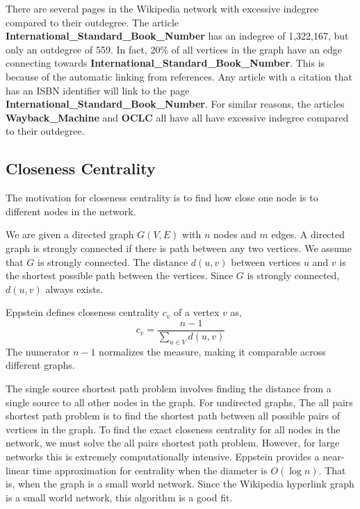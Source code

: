 \documentclass{article}
\begin{document}
There are several pages in the Wikipedia network with excessive indegree compared to their outdegree. 
The article \textbf{International\_Standard\_Book\_Number} has an indegree of 1,322,167, but only an outdegree of 559. In fact, 20\% of all vertices in the graph have an edge connecting towards \textbf{International\_Standard\_Book\_Number}.
This is because of the automatic linking from references.
Any article with a citation that has an ISBN identifier will link to the page \textbf{International\_Standard\_Book\_Number}.
For similar reasons, the articles \textbf{Wayback\_Machine} and \textbf{OCLC} all have all have excessive indegree compared to their outdegree.



\subsection{Closeness Centrality}


The motivation for closeness centrality is to find how close one node is to different nodes in the network.


We are given a directed graph $G(V,E)$ with $n$ nodes and $m$ edges.
A directed graph is strongly connected if there is path between any two vertices. We assume that $G$ is strongly connected.
The distance $d(u, v)$ between vertices $u$ and $v$ is the shortest possible path between the vertices. Since $G$ is strongly connected, $d(u, v)$ always exists.


Eppstein defines closeness centrality $c_v$ of a vertex $v$ as,
\begin{equation*}
    c_v = \frac{n-1}{\sum_{u \in V}d(u,v)}
\end{equation*} 
The numerator $n-1$ normalizes the measure, making it comparable across different graphs.


The single source shortest path problem involves finding the distance from a single source to all other nodes in the graph. For undirected graphs, 
The all pairs shortest path problem is to find the shortest path between all possible pairs of vertices in the graph.
To find the exact closeness centrality for all nodes in the network, we must solve the all pairs shortest path problem. However, for large networks this is extremely computationally intensive. 
Eppstein provides a near-linear time approximation for centrality when the diameter is $O(\log n)$. That is, when the graph is a small world network. Since the Wikipedia hyperlink graph is a small world network, this algorithm is a good fit.
\end{document}
